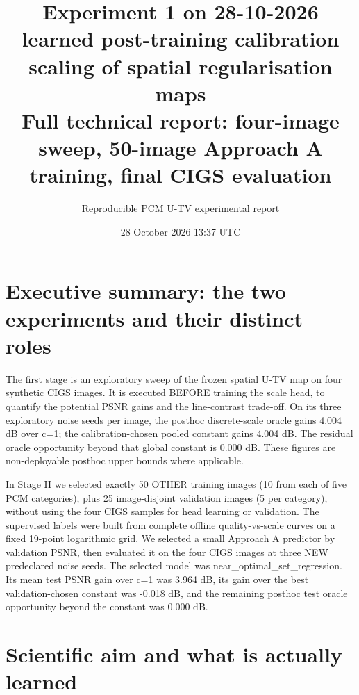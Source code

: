 \documentclass[11pt,a4paper]{article}
\begin{document}
\title{Experiment 1 on 28-10-2026\\[0.35em]\large learned post-training calibration scaling of spatial regularisation maps\\[0.5em]\normalsize Full technical report: four-image sweep, 50-image Approach A training, final CIGS evaluation}

\author{Reproducible PCM U-TV experimental report}

\date{28 October 2026 13:37 UTC}

\maketitle

\tableofcontents

\clearpage

\section{Executive summary: the two experiments and their distinct roles}

The first stage is an exploratory sweep of the frozen spatial U-TV map on four synthetic CIGS images. It is executed BEFORE training the scale head, to quantify the potential PSNR gains and the line-contrast trade-off. On its three exploratory noise seeds per image, the posthoc discrete-scale oracle gains 4.004 dB over c=1; the calibration-chosen pooled constant gains 4.004 dB. The residual oracle opportunity beyond that global constant is 0.000 dB. These figures are non-deployable posthoc upper bounds where applicable.

In Stage II we selected exactly 50 OTHER training images (10 from each of five PCM categories), plus 25 image-disjoint validation images (5 per category), without using the four CIGS samples for head learning or validation. The supervised labels were built from complete offline quality-vs-scale curves on a fixed 19-point logarithmic grid. We selected a small Approach A predictor by validation PSNR, then evaluated it on the four CIGS images at three NEW predeclared noise seeds. The selected model was near\_optimal\_set\_regression. Its mean test PSNR gain over c=1 was 3.964 dB, its gain over the best validation-chosen constant was -0.018 dB, and the remaining posthoc test oracle opportunity beyond the constant was 0.000 dB.

\section{Scientific aim and what is actually learned}
\end{document}
